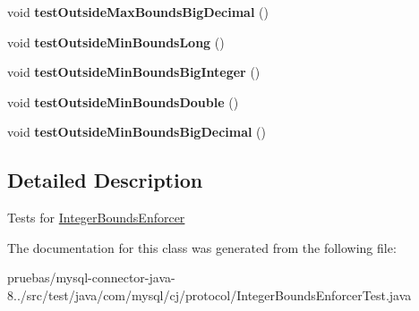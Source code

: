 \begin{DoxyCompactItemize}
void {\bfseries test\+Outside\+Max\+Bounds\+Big\+Decimal} ()
\item 
\mbox{\label{classcom_1_1mysql_1_1cj_1_1protocol_1_1_integer_bounds_enforcer_test_ac8e17851de4283ff34294c3e877e6fc8}} 
void {\bfseries test\+Outside\+Min\+Bounds\+Long} ()
\item 
\mbox{\label{classcom_1_1mysql_1_1cj_1_1protocol_1_1_integer_bounds_enforcer_test_acc7700872dae62f58dd7b436e89d3f28}} 
void {\bfseries test\+Outside\+Min\+Bounds\+Big\+Integer} ()
\item 
\mbox{\label{classcom_1_1mysql_1_1cj_1_1protocol_1_1_integer_bounds_enforcer_test_aadb0a9eacd0f267f63c08898f5695504}} 
void {\bfseries test\+Outside\+Min\+Bounds\+Double} ()
\item 
\mbox{\label{classcom_1_1mysql_1_1cj_1_1protocol_1_1_integer_bounds_enforcer_test_ad7f36c005ed375a37bf287c6c27b960f}} 
void {\bfseries test\+Outside\+Min\+Bounds\+Big\+Decimal} ()
\end{DoxyCompactItemize}


\subsection{Detailed Description}
Tests for \mbox{\hyperlink{}{Integer\+Bounds\+Enforcer}} 

The documentation for this class was generated from the following file\+:\begin{DoxyCompactItemize}
\item 
pruebas/mysql-\/connector-\/java-\/8../src/test/java/com/mysql/cj/protocol/Integer\+Bounds\+Enforcer\+Test.\+java\end{DoxyCompactItemize}
